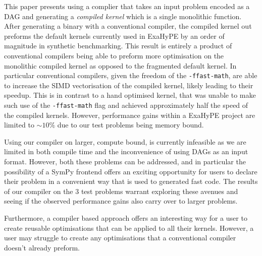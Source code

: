 This paper presents using a complier that takes an input problem encoded as a DAG and generating a \textit{compiled kernel} which is a single monolithic function.
After generating a binary with a conventional compiler, the compiled kernel out preforms the default kernels currently used in ExaHyPE by an order of magnitude in synthetic benchmarking.
This result is entirely a product of conventional compilers being able to preform more optimisation on the monolithic compiled kernel as opposed to the fragmented default kernel.
In particular conventional compilers, given the freedom of the \texttt{-ffast-math}, are able to increase the SIMD vectorisation of the compiled kernel, likely leading to their speedup.
This is in contrast to a hand optimised kernel, that was unable to make such use of the \texttt{-ffast-math} flag and achieved approximately half the speed of the compiled kernels.
However, performance gains within a ExaHyPE project are limited to $\sim 10\%$ due to our test problems being memory bound.

Using our compiler on larger, compute bound, is currently infeasible as we are limited in both compile time and the inconvenience of using DAGs as an input format.
However, both these problems can be addressed, and in particular the possibility of a SymPy frontend offers an exciting opportunity for users to declare their problem in a convenient way that is used to generated fast code. 
The results of our compiler on the 3 test problems warrant exploring these avenues and seeing if the observed performance gains also carry over to larger problems.

Furthermore, a compiler based approach offers an interesting way for a user to create reusable optimisations that can be applied to all their kernels.
However, a user may struggle to create any optimisations that a conventional compiler doesn't already preform.


